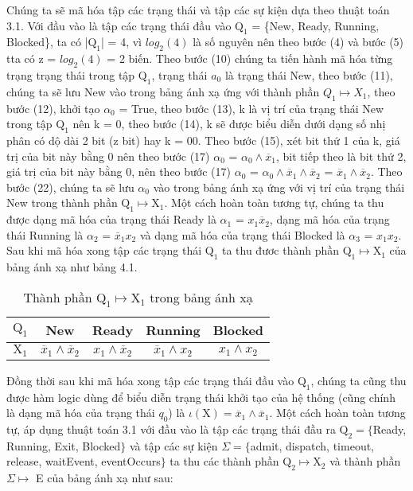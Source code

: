 \documentclass[a4paper,13pt,oneside,openany]{book}
\begin{document}
\begin{flushleft}
	Chúng ta sẽ mã hóa tập các trạng thái và tập các sự kiện dựa theo thuật toán 3.1. Với đầu vào là tập các trạng thái đầu vào $\textrm{Q}_1$ = \{New, Ready, Running,\\Blocked\}, ta có |$\textrm{Q}_1$| = 4, vì $log_2(4)$ là số nguyên nên theo bước (4) và bước (5) tta có z = $log_2(4)$ = 2 biến. Theo bước (10) chúng ta tiến hành mã hóa từng trạng trạng thái trong tập $\textrm{Q}_1$, trạng thái $a_0$ là trạng thái New, theo bước (11), chúng ta sẽ lưu New vào trong bảng ánh xạ ứng với thành phần $Q_1 \mapsto X_1$, theo bước (12), khởi tạo $\alpha_0$ = True, theo bước (13), k là vị trí của trạng thái New trong tập $\textrm{Q}_1$ nên k = 0, theo bước (14), k sẽ được biểu diễn dưới dạng số nhị phân có dộ dài 2 bit (z bit) hay k = 00. Theo bước (15), xét bit thứ 1 của k, giá trị của bit này bằng 0 nên theo bước (17) $\alpha_0$ = $\alpha_0 \land \overline{x}_1$, bit tiếp theo là bit thứ 2, giá trị của bit này bằng 0, nên theo bước (17) $\alpha_0$ = $\alpha_0 \land \overline{x}_1 \land \overline{x}_2$ = $ \overline{x}_1 \land \overline{x}_2$. Theo bước (22), chúng ta sẽ lưu $\alpha_0$ vào trong bảng ánh xạ ứng với vị trí của trạng thái New trong thành phần $\textrm{Q}_1 \mapsto \textrm{X}_1$. Một cách hoàn toàn tương tự, chúng ta thu được dạng mã hóa của trạng thái Ready là $\alpha_1$ = $x_1\overline{x}_2$, dạng mã hóa của trạng thái Running là $\alpha_2$ = $\overline{x}_1x_2$ và dạng mã hóa của trạng thái Blocked là $\alpha_3$ = $x_1x_2$. Sau khi mã hóa xong tập các trạng thái $\textrm{Q}_1$ ta thu đươc thành phần $\textrm{Q}_1 \mapsto \textrm{X}_1$ của bảng ánh xạ như bảng 4.1.
	\begin{table}[!ht]
		\centering
		\renewcommand{\arraystretch}{1.25}
		\begin{tabular}{|c|c|c|c|c|}
			\hline
			$\textrm{Q}_1$ & New & Ready & Running & Blocked\\
			\hline
			$\textrm{X}_1$ & $\overline{x}_1 \land \overline{x}_2$ & $x_1\land\overline{x}_2$&$\overline{x}_1\land x_2$ &
			$x_1 \land x_2$\\
			\hline
		\end{tabular}
		\caption{Thành phần $\textrm{Q}_1 \mapsto \textrm{X}_1$ trong bảng ánh xạ}
	\end{table}
	\noindent
	Đồng thời sau khi mã hóa xong tập các trạng thái đầu vào $\textrm{Q}_1$, chúng ta cũng thu được hàm logic dùng để biểu diễn trạng thái khởi tạo của hệ thống (cũng chính là dạng mã hóa của trạng thái $q_0$) là $\iota(\textrm{X}) = \overline{x}_1 \land \overline{x}_1$. Một cách hoàn toàn tương tự, áp dụng thuật toán 3.1 với đầu vào là tập các trạng thái đầu ra $\textrm{Q}_2 = \{$Ready, Running, Exit, Blocked$\}$ và tập các sự kiện $\Sigma = \{$admit, dispatch, timeout, release, waitEvent, eventOccurs$\}$ ta thu các thành phần $\textrm{Q}_2 \mapsto \textrm{X}_2$ và thành phần $\Sigma \mapsto$ E của bảng ánh xạ như sau:
	

\end{flushleft}
\end{document}
